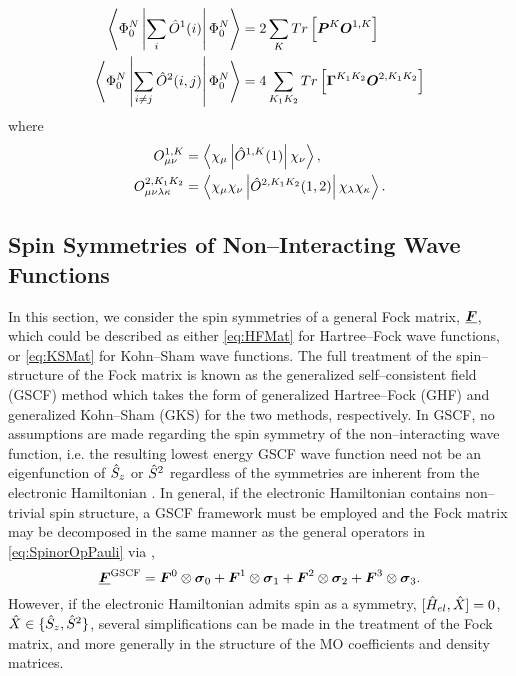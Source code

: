 \begin{align}
  \label{eq:BasisDenMatInner}
  \left\langle \Phi^N_0 \left\vert \sum_i \hat{O}^1(i) \right\vert \Phi^N_0 \right\rangle &= 2\sum_K Tr \left[ \boldsymbol{P}^K \boldsymbol{O}^{1,K} \right] \\
  \left\langle \Phi^N_0 \left\vert \sum_{i\neq j} \hat{O}^2(i,j) \right\vert \Phi^N_0 \right\rangle &= 4\sum_{K_1K_2} Tr \left[ \boldsymbol{\Gamma}^{K_1K_2} \boldsymbol{O}^{2,K_1K_2} \right]
\end{align}
where
\begin{align}
  O_{\mu\nu}^{1,K} &= \left\langle \chi_\mu \left\vert \hat{O}^{1,K}(1) \right\vert \chi_\nu \right\rangle,\\
  O_{\mu\nu\lambda\kappa}^{2,K_1K_2} &= \left\langle \chi_\mu\chi_\nu \left\vert \hat{O}^{2,K_1K_2}(1,2) \right\vert \chi_\lambda\chi_\kappa \right\rangle.
\end{align}




\subsection{Spin Symmetries of Non--Interacting Wave Functions} 
\label{sec:SpinSymm}

In this section, we consider the spin symmetries of a general Fock matrix, $\boldsymbol{\underline{F}}$, which could be described as either
\cref{eq:HFMat} for Hartree--Fock wave functions, or \cref{eq:KSMat} for Kohn--Sham wave functions.
The full treatment of the spin--structure of the Fock matrix is known as the generalized self--consistent field (GSCF) method
which takes the form of generalized Hartree--Fock (GHF) and generalized Kohn--Sham (GKS) for the two methods, respectively.
In GSCF, no assumptions are made regarding the spin symmetry of the non--interacting wave function, i.e. the resulting lowest 
energy
GSCF wave function need not be an eigenfunction of $\hat{S}_z$ or $\hat{S}^2$ regardless of the symmetries are inherent
from the electronic Hamiltonian . In general, if the electronic Hamiltonian contains non--trivial 
spin structure,
a GSCF framework must be employed and the Fock matrix may be decomposed in the same manner as the general operators
in \cref{eq:SpinorOpPauli} via ,
\begin{equation}
  \label{eq:GSCFFock}
  \boldsymbol{\underline{F}}^\mathrm{GSCF} = \boldsymbol{F}^0 \otimes \boldsymbol{\sigma}_{0} + \boldsymbol{F}^1 \otimes \boldsymbol{\sigma}_{1} + \boldsymbol{F}^2 \otimes \boldsymbol{\sigma}_{2} + \boldsymbol{F}^3 \otimes \boldsymbol{\sigma}_{3}.
\end{equation}
However, if the electronic Hamiltonian admits spin as a symmetry, 
$[\hat{H}_{el},\hat{X}] = 0$, $\hat{X} \in \{\hat{S}_z,\hat{S}^2\}$, several simplifications can be made in the treatment of the
Fock matrix, and more generally in the structure of the MO coefficients and density matrices.

